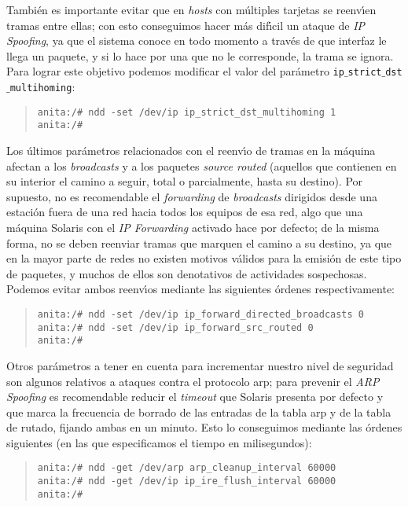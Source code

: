 Tambi\'en es importante evitar que en {\it hosts} con m\'ultiples tarjetas se
reenv\'{\i}en tramas entre ellas; con esto conseguimos hacer m\'as dif\'{\i}cil 
un ataque de {\it IP Spoofing}, ya que el sistema conoce en todo momento a 
trav\'es de que interfaz le llega un paquete, y si lo hace por una que no le
corresponde, la trama se ignora. Para lograr este objetivo podemos modificar el
valor del par\'ametro {\tt ip$\_$strict$\_$dst$\_$multihoming}:
\begin{quote}
\begin{verbatim}
anita:/# ndd -set /dev/ip ip_strict_dst_multihoming 1
anita:/#
\end{verbatim}
\end{quote}
Los \'ultimos par\'ametros relacionados con el reenv\'{\i}o de tramas en la
m\'aquina afectan a los {\it broadcasts} y a los paquetes {\it source routed}
(aquellos que contienen en su interior el camino a seguir, total o 
parcialmente, hasta su destino). Por supuesto, no es recomendable el {\it 
forwarding} de {\it broadcasts} dirigidos desde una estaci\'on fuera de una red
hacia todos los equipos de esa red, algo que una m\'aquina Solaris con el {\it
IP Forwarding} activado hace por defecto; de la misma forma, no se deben 
reenviar tramas que marquen el camino a su destino, ya que en la mayor parte de
redes no existen motivos v\'alidos para la emisi\'on de este tipo de paquetes,
y muchos de ellos son denotativos de actividades sospechosas. Podemos evitar
ambos reenv\'{\i}os mediante las siguientes \'ordenes respectivamente:
\begin{quote}
\begin{verbatim}
anita:/# ndd -set /dev/ip ip_forward_directed_broadcasts 0
anita:/# ndd -set /dev/ip ip_forward_src_routed 0
anita:/#
\end{verbatim}
\end{quote}
Otros par\'ametros a tener en cuenta para incrementar nuestro nivel de 
seguridad son algunos relativos a ataques contra el protocolo {\sc arp}; para
prevenir el {\it ARP Spoofing} es recomendable reducir el {\it timeout} que 
Solaris presenta por defecto y que marca la frecuencia de borrado de las 
entradas de la tabla {\sc arp} y de la tabla de rutado, fijando ambas en un 
minuto. Esto lo conseguimos mediante las \'ordenes siguientes (en las que 
especificamos el tiempo en milisegundos):
\begin{quote}
\begin{verbatim}
anita:/# ndd -get /dev/arp arp_cleanup_interval 60000
anita:/# ndd -get /dev/ip ip_ire_flush_interval 60000
anita:/# 
\end{verbatim}
\end{quote}
